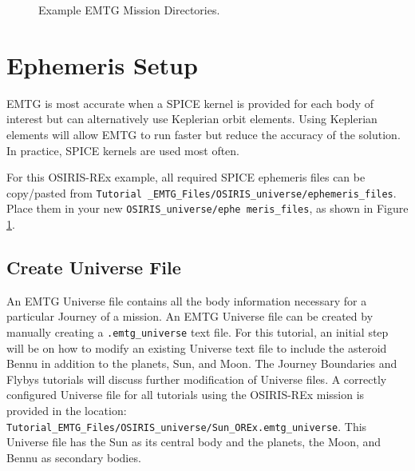 \documentclass[11pt]{article}
\begin{document}
\begin{figure}[H]
	\centering
	\caption{\label{fig:folder_structure}Example \ac{EMTG} Mission Directories.}
\end{figure}

\section{Ephemeris Setup}
\label{sec:ephemeris_setup}

\ac{EMTG} is most accurate when a \acs{SPICE} kernel is provided for each body of interest but can alternatively use Keplerian orbit elements. Using Keplerian elements will allow \ac{EMTG} to run faster but reduce the accuracy of the solution. In practice, \acs{SPICE} kernels are used most often.

\noindent For this OSIRIS-REx example, all required \acs{SPICE} ephemeris files can be copy/pasted from  \texttt{Tutorial \_EMTG\_Files/OSIRIS\_universe/ephemeris\_files}. Place them in your new \texttt{OSIRIS\_universe/ephe meris\_files}, as shown in Figure \ref{fig:folder_structure}. 

\subsection{Create Universe File}
\label{sec:create_universe_file}

An \ac{EMTG} Universe file contains all the body information necessary for a particular Journey of a mission. An \ac{EMTG} Universe file can be created by manually creating a \texttt{.emtg\_universe} text file. For this tutorial, an initial step will be on how to modify an existing Universe text file to include the asteroid Bennu in addition to the planets, Sun, and Moon. The Journey Boundaries and Flybys tutorials will discuss further modification of Universe files. A correctly configured Universe file for all tutorials using the OSIRIS-REx mission is provided in the location: \texttt{Tutorial\_EMTG\_Files/OSIRIS\_universe/Sun\_OREx.emtg\_universe}. This Universe file has the Sun as its central body and the planets, the Moon, and Bennu as secondary bodies.
\end{document}
